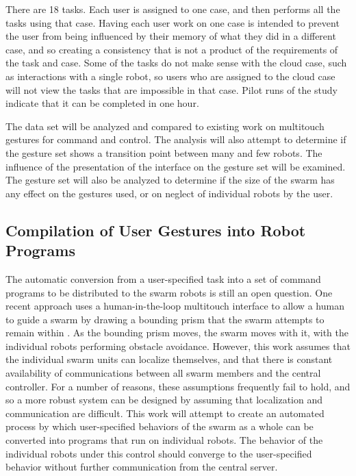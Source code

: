 \documentclass[]{article}
\begin{document}
There are 18 tasks. 
Each user is assigned to one case, and then performs all the tasks using that case. 
Having each user work on one case is intended to prevent the user from being influenced by their memory of what they did in a different case, and so creating a consistency that is not a product of the requirements of the task and case. 
Some of the tasks do not make sense with the cloud case, such as interactions with a single robot, so users who are assigned to the cloud case will not view the tasks that are impossible in that case.
Pilot runs of the study indicate that it can be completed in one hour. 

The data set will be analyzed and compared to existing work on multitouch gestures for command and control. 
The analysis will also attempt to determine if the gesture set shows a transition point between many and few robots. 
The influence of the presentation of the interface on the gesture set will be examined. 
The gesture set will also be analyzed to determine if the size of the swarm has any effect on the gestures used, or on neglect of individual robots by the user. 

\subsection{Compilation of User Gestures into Robot Programs}
The automatic conversion from a user-specified task into a set of command programs to be distributed to the swarm robots is still an open question.
One recent approach uses a human-in-the-loop multitouch interface to allow a human to guide a swarm by drawing a bounding prism that the swarm attempts to remain within \cite{ayanian2014controlling}. 
As the bounding prism moves, the swarm moves with it, with the individual robots performing obstacle avoidance. 
However, this work assumes that the individual swarm units can localize themselves, and that there is constant availability of communications between all swarm members and the central controller. 
For a number of reasons, these assumptions frequently fail to hold, and so a more robust system can be designed by assuming that localization and communication are difficult. 
This work will attempt to create an automated process by which user-specified behaviors of the swarm as a whole can be converted into programs that run on individual robots. 
The behavior of the individual robots under this control should converge to the user-specified behavior without further communication from the central server.
\end{document}
